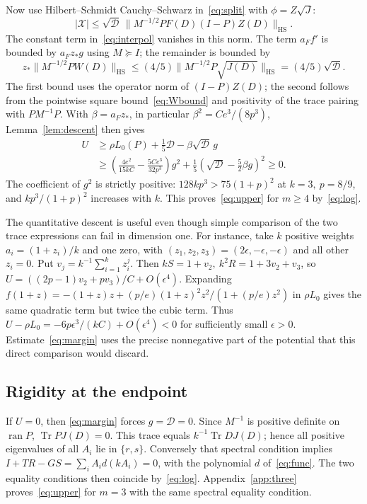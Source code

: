 \documentclass[11pt]{article}
\newcommand{\Tr}{\operatorname{Tr}}
\newcommand{\ran}{\operatorname{ran}}
\newcommand{\HS}{\mathrm{HS}}
\begin{document}
Now use Hilbert--Schmidt Cauchy--Schwarz in~\eqref{eq:split} with
\(\phi=Z\sqrt J\):
\[
|\mathcal X|\le\sqrt{\mathcal D}\,
\|M^{-1/2}P F(D)(I-P)Z(D)\|_{\HS}.
\]
The constant term in~\eqref{eq:interpol} vanishes in this norm.
The term \(a_Ff'\) is bounded by \(a_F z_*g\) using \(M\succeq I\);
the remainder is bounded by
\[
z_*\|M^{-1/2}P W(D)\|_{\HS}
\le(4/5)\|M^{-1/2}P\sqrt{J(D)}\|_{\HS}
=(4/5)\sqrt{\mathcal D}.
\]
The first bound uses the operator norm of \((I-P)Z(D)\);
the second follows from the pointwise square bound~\eqref{eq:Wbound}
and positivity of the trace pairing with \(PM^{-1}P\).
With \(\beta=a_F z_*\), in particular \(\beta^2=Ce^3/(8p^3)\),
Lemma~\ref{lem:descent} then gives
\begin{equation}\label{eq:margin}
\begin{split}
 U&\ge \rho L_0(P)+\tfrac15\mathcal D-\beta\sqrt{\mathcal D}\,g\\
 &\ge \left(\frac{4e^2}{15kC}-\frac{5Ce^3}{32p^3}\right)g^2
       +\frac15\left(\sqrt{\mathcal D}-\frac52\beta g\right)^2\ge0.
\end{split}
\end{equation}
The coefficient of \(g^2\) is strictly positive:
\(128kp^3>75(1+p)^2\) at \(k=3,\ p=8/9\), and
\(kp^3/(1+p)^2\) increases with \(k\).
This proves~\eqref{eq:upper} for \(m\ge4\) by~\eqref{eq:log}.

The quantitative descent is useful even though simple comparison of
the two trace expressions can fail in dimension one. For instance, take
\(k\) positive weights \(a_i=(1+z_i)/k\) and one zero, with
\((z_1,z_2,z_3)=(2\epsilon,-\epsilon,-\epsilon)\) and all other
\(z_i=0\). Put \(v_j=k^{-1}\sum_{i=1}^k z_i^j\).
Then \(kS=1+v_2,\ k^2R=1+3v_2+v_3\), so
\(U=((2p-1)v_2+pv_3)/C+O(\epsilon^4)\).
Expanding \(f(1+z)=-(1+z)z+(p/e)(1+z)^2z^2/(1+(p/e)z^2)\)
in \(\rho L_0\) gives the same quadratic term but twice the cubic term.
Thus \(U-\rho L_0=-6p\epsilon^3/(kC)+O(\epsilon^4)<0\) for
sufficiently small \(\epsilon>0\). Estimate~\eqref{eq:margin}
uses the precise nonnegative part of the potential that this direct
comparison would discard.

\subsection*{Rigidity at the endpoint}

If \(U=0\), then \eqref{eq:margin} forces \(g=\mathcal D=0\).
Since \(M^{-1}\) is positive definite on \(\ran P\),
\(\Tr P J(D)=0\). This trace equals \(k^{-1}\Tr D J(D)\);
hence all positive eigenvalues of all \(A_i\) lie in \(\{r,s\}\).
Conversely that spectral condition implies \(I+TR-GS=\sum_i
 A_i d(kA_i)=0\), with the polynomial \(d\) of~\eqref{eq:func}.
The two equality conditions then coincide by~\eqref{eq:log}.
Appendix~\ref{app:three} proves~\eqref{eq:upper} for \(m=3\)
with the same spectral equality condition.
\end{document}
